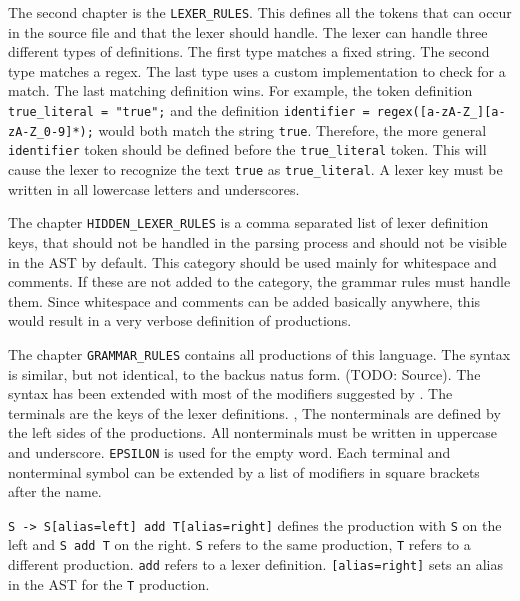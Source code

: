 The second chapter is the \verb|LEXER_RULES|. 
This defines all the tokens that can occur in the source file and that the lexer should handle. 
The lexer can handle three different types of definitions. 
The first type matches a fixed string. The second type matches a regex. 
The last type uses a custom implementation to check for a match. 
The last matching definition wins. 
For example, the token definition \verb|true_literal = "true";| and the definition \verb|identifier = regex([a-zA-Z_][a-zA-Z_0-9]*);| would both match the string \verb|true|. 
Therefore, the more general \verb|identifier| token should be defined before the \verb|true_literal| token. 
This will cause the lexer to recognize the text \verb|true| as \verb|true_literal|. 
A lexer key must be written in all lowercase letters and underscores.

The chapter \verb|HIDDEN_LEXER_RULES| is a comma separated list of lexer definition keys, 
that should not be handled in the parsing process and should not be visible in the AST by default.
This category should be used mainly for whitespace and comments. If these are not added to the category, the grammar rules must handle them.
Since whitespace and comments can be added basically anywhere, this would result in a very verbose definition of productions.

The chapter \verb|GRAMMAR_RULES| contains all productions of this language. The syntax is similar, but not identical, to the backus natus form. (TODO: Source). 
The syntax has been extended with most of the modifiers suggested by \cite{GeneratingRewritableAST}. 
The terminals are the keys of the lexer definitions. ,
The nonterminals are defined by the left sides of the productions. 
All nonterminals must be written in uppercase and underscore. 
\verb|EPSILON| is used for the empty word. 
Each terminal and nonterminal symbol can be extended by a list of modifiers in square brackets after the name. 

\verb|S -> S[alias=left] add T[alias=right]| defines the production with \verb|S| on the left and \verb|S add T| on the right. 
\verb|S| refers to the same production, \verb|T| refers to a different production. 
\verb|add| refers to a lexer definition. 
\verb|[alias=right]| sets an alias in the AST for the \verb|T| production.